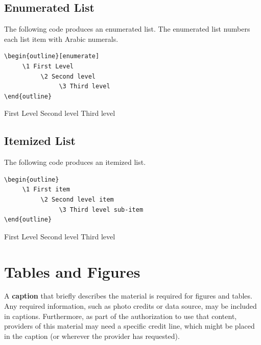  \subsection*{Enumerated List}
 The following code produces an enumerated list.  The enumerated list numbers each list item with Arabic numerals.
 
\begin{verbatim}
\begin{outline}[enumerate]
     \1 First Level
          \2 Second level
               \3 Third level
\end{outline}
 \end{verbatim}
 
 \begin{outline}[enumerate]
 	\1 First Level
		\2 Second level
			\3 Third level
\end{outline}
 

 \subsection*{Itemized List}
 The following code produces an itemized list.
 
\begin{verbatim}
\begin{outline}
     \1 First item
          \2 Second level item
               \3 Third level sub-item
\end{outline}
 \end{verbatim}
 
 \begin{outline}
 	\1 First Level
		\2 Second level
			\3 Third level
\end{outline}



\section*{Tables and Figures}

A \textbf{caption} that briefly describes the material is required for figures and tables.  Any required information, such as photo credits or data source, may be included in captions. Furthermore, as part of the authorization to use that content, providers of this material may need a specific credit line, which might be placed in the caption (or wherever the provider has requested).  


